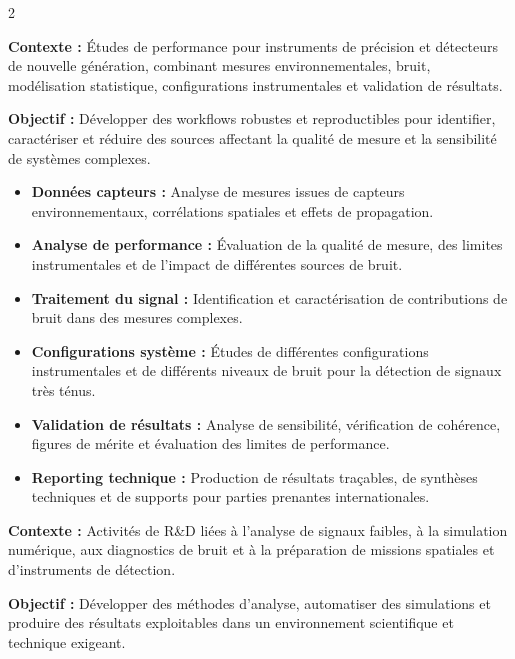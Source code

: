 \documentclass[8pt,a4paper,ragged2e,withhyper]{altacv}
\begin{document}
\begin{paracol}{2}
\divider


\textbf{Contexte :} Études de performance pour instruments de précision et détecteurs de nouvelle génération, combinant mesures environnementales, bruit, modélisation statistique, configurations instrumentales et validation de résultats.

\textbf{Objectif :} Développer des workflows robustes et reproductibles pour identifier, caractériser et réduire des sources affectant la qualité de mesure et la sensibilité de systèmes complexes.

\begin{itemize}
  \item \textbf{Données capteurs :} Analyse de mesures issues de capteurs environnementaux, corrélations spatiales et effets de propagation.
  \item \textbf{Analyse de performance :} Évaluation de la qualité de mesure, des limites instrumentales et de l’impact de différentes sources de bruit.
  \item \textbf{Traitement du signal :} Identification et caractérisation de contributions de bruit dans des mesures complexes.
  \item \textbf{Configurations système :} Études de différentes configurations instrumentales et de différents niveaux de bruit pour la détection de signaux très ténus.
  \item \textbf{Validation de résultats :} Analyse de sensibilité, vérification de cohérence, figures de mérite et évaluation des limites de performance.
  \item \textbf{Reporting technique :} Production de résultats traçables, de synthèses techniques et de supports pour parties prenantes internationales.
\end{itemize}

\divider


\textbf{Contexte :} Activités de R\&D liées à l’analyse de signaux faibles, à la simulation numérique, aux diagnostics de bruit et à la préparation de missions spatiales et d’instruments de détection.

\textbf{Objectif :} Développer des méthodes d’analyse, automatiser des simulations et produire des résultats exploitables dans un environnement scientifique et technique exigeant.


\end{paracol}
\end{document}
